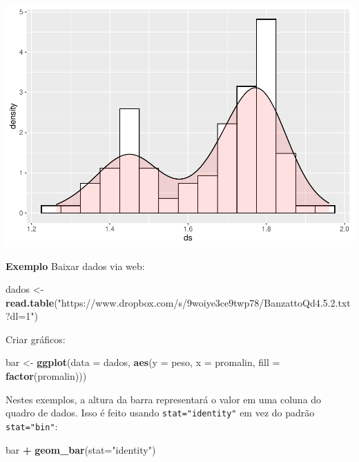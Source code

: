 \documentclass[
]{book}
\newenvironment{Shaded}{\begin{snugshade}}{\end{snugshade}}
\newcommand{\DataTypeTok}[1]{\textcolor[rgb]{0.13,0.29,0.53}{#1}}
\newcommand{\KeywordTok}[1]{\textcolor[rgb]{0.13,0.29,0.53}{\textbf{#1}}}
\newcommand{\NormalTok}[1]{#1}
\newcommand{\OperatorTok}[1]{\textcolor[rgb]{0.81,0.36,0.00}{\textbf{#1}}}
\newcommand{\StringTok}[1]{\textcolor[rgb]{0.31,0.60,0.02}{#1}}
\begin{document}
\includegraphics{TudodoR_files/figure-latex/unnamed-chunk-194-1.pdf}

\textbf{Exemplo}
Baixar dados via web:

\begin{Shaded}
\begin{Highlighting}[]
\NormalTok{dados <-}\StringTok{ }\KeywordTok{read.table}\NormalTok{(}\StringTok{"https://www.dropbox.com/s/9woiye3ce9twp78/BanzattoQd4.5.2.txt?dl=1"}\NormalTok{)}
\end{Highlighting}
\end{Shaded}

Criar gráficos:

\begin{Shaded}
\begin{Highlighting}[]
\NormalTok{bar <-}\StringTok{ }\KeywordTok{ggplot}\NormalTok{(}\DataTypeTok{data =}\NormalTok{ dados, }\KeywordTok{aes}\NormalTok{(}\DataTypeTok{y =}\NormalTok{ peso, }\DataTypeTok{x =}\NormalTok{ promalin, }\DataTypeTok{fill =} \KeywordTok{factor}\NormalTok{(promalin)))}
\end{Highlighting}
\end{Shaded}

Nestes exemplos, a altura da barra representará o valor em uma coluna do quadro de dados. Isso é feito usando \texttt{stat="identity"} em vez do padrão \texttt{stat="bin"}:

\begin{Shaded}
\begin{Highlighting}[]
\NormalTok{bar }\OperatorTok{+}\StringTok{  }\KeywordTok{geom_bar}\NormalTok{(}\DataTypeTok{stat=}\StringTok{"identity"}\NormalTok{)}
\end{Highlighting}
\end{Shaded}
\end{document}
